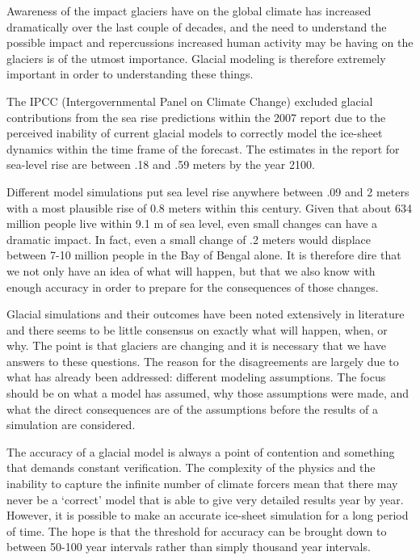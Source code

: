 Awareness of the impact glaciers have on the global climate has increased dramatically over the last couple of decades, and the need to understand the possible impact and repercussions increased human activity may be having on the glaciers is of the utmost importance.  Glacial modeling is therefore extremely important in order to understanding these things.

The IPCC (Intergovernmental Panel on Climate Change) excluded glacial contributions from the sea rise predictions within the 2007 report due to the perceived inability of current glacial models to correctly model the ice-sheet dynamics within the time frame of the forecast.  The estimates in the report for sea-level rise are between .18 and .59 meters by the year 2100. \citep{IPCC2007}

Different model simulations put sea level rise anywhere between .09 and 2 meters with a most plausible rise of 0.8 meters within this century.\citep{Pfeffer:2008}  Given that about 634 million people live within 9.1 m of sea level, even small changes can have a dramatic impact.  In fact, even a small change of .2 meters would displace between 7-10 million people in the Bay of Bengal alone.  \citep{McGranahan:2007}  It is therefore dire that we not only have an idea of what will happen, but that we also know with enough accuracy in order to prepare for the consequences of those changes.

Glacial simulations and their outcomes have been noted extensively in literature and there seems to be little consensus on exactly what will happen, when, or why.  The point is that glaciers are changing and it is necessary that we have answers to these questions.  The reason for the disagreements are largely due to what has already been addressed: different modeling assumptions.  The focus should be on what a model has assumed, why those assumptions were made, and what the direct consequences are of the assumptions before the results of a simulation are considered.


The accuracy of a glacial model is always a point of contention and something that demands constant verification.  The complexity of the physics and the inability to capture the infinite number of climate forcers mean that there may never be a `correct' model that is able to give very detailed results year by year.  However, it is possible to make an accurate ice-sheet simulation for a long period of time.  The hope is that the threshold for accuracy can be brought down to between 50-100 year intervals rather than simply thousand year intervals.  

